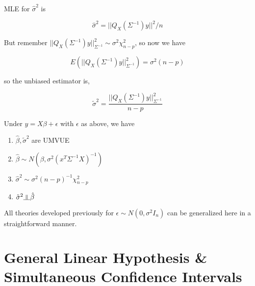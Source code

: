 \documentclass[11pt,fleqn]{book} %
\newcommand{\indep}{\rotatebox[origin=c]{90}{$\models$}}
\begin{document}
MLE for $\hat{\sigma}^2$ is

$$\hat{\sigma}^2 = ||Q_X(\Sigma^{-1})y ||^2/n $$ 


But remember $||Q_X(\Sigma^{-1})y ||^2_{\Sigma^{-1}} \sim \sigma^2 \chi^2_{n-p}$, so now we have

$$E\left(||Q_X(\Sigma^{-1})y ||^2_{\Sigma^{-1}} \right) = \sigma^2 (n-p)$$

so the unbiased estimator is, 

$$\tilde{\sigma}^2 = \frac{||Q_X(\Sigma^{-1})y ||^2_{\Sigma^{-1}}}{n - p} $$


\begin{theorem}
	Under $y = X\beta + \epsilon$  with $\epsilon$ as above, we have

	\begin{enumerate}
		\item $\hat{\beta}, \tilde{\sigma}^2$ are UMVUE
		\item $\hat{\beta} \sim N(\beta, \sigma^2(x^T\Sigma^{-1}X)^{-1})$
		\item $\hat{\sigma}^2 \sim \sigma^2(n-p)^{-1} \chi^2_{n-p}$
		\item $\tilde{\sigma}^2 \indep \hat{\beta}$
	\end{enumerate}
	
	All theories developed previously for $\epsilon \sim N(0, \sigma^2 I_n)$ can be generalized here in a straightforward manner.
\end{theorem}




\chapter{General Linear Hypothesis \& Simultaneous Confidence Intervals}


\end{document}
